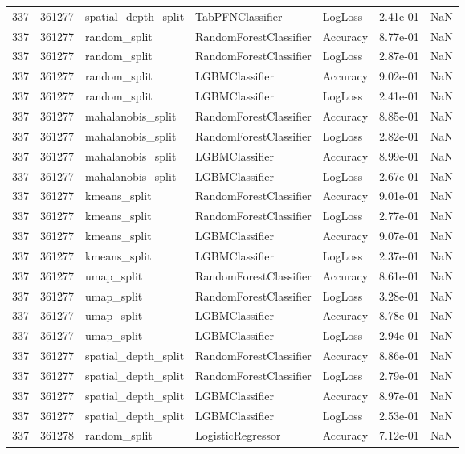 \begin{tabular}{rrlllrr}
337 & 361277 & spatial\_depth\_split & TabPFNClassifier & LogLoss & 2.41e-01 & NaN \\
337 & 361277 & random\_split & RandomForestClassifier & Accuracy & 8.77e-01 & NaN \\
337 & 361277 & random\_split & RandomForestClassifier & LogLoss & 2.87e-01 & NaN \\
337 & 361277 & random\_split & LGBMClassifier & Accuracy & 9.02e-01 & NaN \\
337 & 361277 & random\_split & LGBMClassifier & LogLoss & 2.41e-01 & NaN \\
337 & 361277 & mahalanobis\_split & RandomForestClassifier & Accuracy & 8.85e-01 & NaN \\
337 & 361277 & mahalanobis\_split & RandomForestClassifier & LogLoss & 2.82e-01 & NaN \\
337 & 361277 & mahalanobis\_split & LGBMClassifier & Accuracy & 8.99e-01 & NaN \\
337 & 361277 & mahalanobis\_split & LGBMClassifier & LogLoss & 2.67e-01 & NaN \\
337 & 361277 & kmeans\_split & RandomForestClassifier & Accuracy & 9.01e-01 & NaN \\
337 & 361277 & kmeans\_split & RandomForestClassifier & LogLoss & 2.77e-01 & NaN \\
337 & 361277 & kmeans\_split & LGBMClassifier & Accuracy & 9.07e-01 & NaN \\
337 & 361277 & kmeans\_split & LGBMClassifier & LogLoss & 2.37e-01 & NaN \\
337 & 361277 & umap\_split & RandomForestClassifier & Accuracy & 8.61e-01 & NaN \\
337 & 361277 & umap\_split & RandomForestClassifier & LogLoss & 3.28e-01 & NaN \\
337 & 361277 & umap\_split & LGBMClassifier & Accuracy & 8.78e-01 & NaN \\
337 & 361277 & umap\_split & LGBMClassifier & LogLoss & 2.94e-01 & NaN \\
337 & 361277 & spatial\_depth\_split & RandomForestClassifier & Accuracy & 8.86e-01 & NaN \\
337 & 361277 & spatial\_depth\_split & RandomForestClassifier & LogLoss & 2.79e-01 & NaN \\
337 & 361277 & spatial\_depth\_split & LGBMClassifier & Accuracy & 8.97e-01 & NaN \\
337 & 361277 & spatial\_depth\_split & LGBMClassifier & LogLoss & 2.53e-01 & NaN \\
337 & 361278 & random\_split & LogisticRegressor & Accuracy & 7.12e-01 & NaN \\

\end{tabular}
